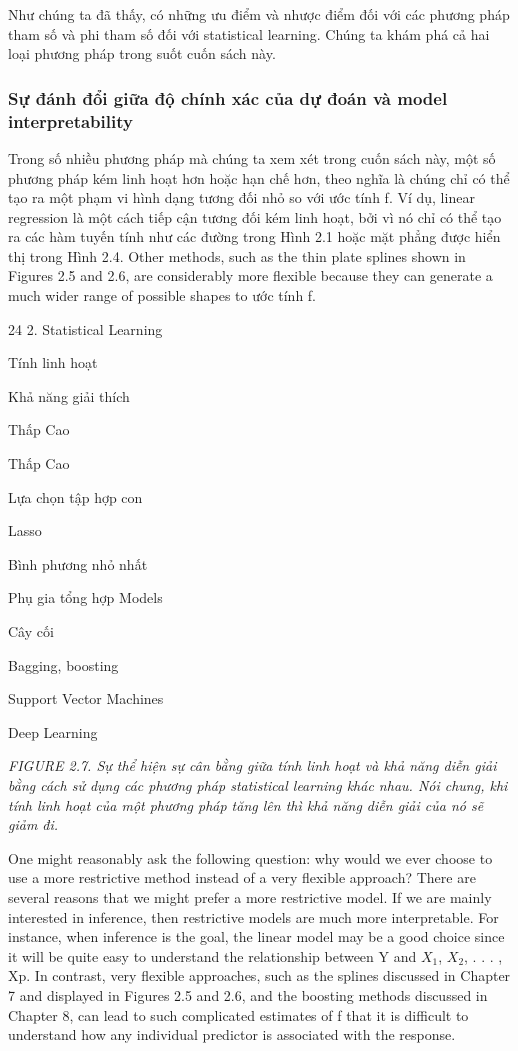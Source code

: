 Như chúng ta đã thấy, có những ưu điểm và nhược điểm đối với các phương pháp tham số và phi tham số đối với statistical learning. Chúng ta khám phá cả hai loại phương pháp trong suốt cuốn sách này.

\subsubsection{Sự đánh đổi giữa độ chính xác của dự đoán và model interpretability}

Trong số nhiều phương pháp mà chúng ta xem xét trong cuốn sách này, một số phương pháp kém linh hoạt hơn hoặc hạn chế hơn, theo nghĩa là chúng chỉ có thể tạo ra một phạm vi hình dạng tương đối nhỏ so với ước tính f. Ví dụ, linear regression là một cách tiếp cận tương đối kém linh hoạt, bởi vì nó chỉ có thể tạo ra các hàm tuyến tính như các đường trong Hình 2.1 hoặc mặt phẳng được hiển thị trong Hình 2.4. Other methods, such as the thin plate splines shown in Figures 2.5 and 2.6, are considerably more flexible because they can generate a much wider range of possible shapes to ước tính f.

24 2. Statistical Learning

Tính linh hoạt

Khả năng giải thích

Thấp Cao

Thấp Cao

Lựa chọn tập hợp con

Lasso

Bình phương nhỏ nhất

Phụ gia tổng hợp Models

Cây cối

Bagging, boosting

Support Vector Machines

Deep Learning

\noindent\textit{FIGURE 2.7. Sự thể hiện sự cân bằng giữa tính linh hoạt và khả năng diễn giải bằng cách sử dụng các phương pháp statistical learning khác nhau. Nói chung, khi tính linh hoạt của một phương pháp tăng lên thì khả năng diễn giải của nó sẽ giảm đi.}

One might reasonably ask the following question: why would we ever choose to use a more restrictive method instead of a very flexible approach? There are several reasons that we might prefer a more restrictive model. If we are mainly interested in inference, then restrictive models are much more interpretable. For instance, when inference is the goal, the linear model may be a good choice since it will be quite easy to understand the relationship between Y and $X_{1}$, $X_{2}$, . . . , Xp. In contrast, very flexible approaches, such as the splines discussed in Chapter 7 and displayed in Figures 2.5 and 2.6, and the boosting methods discussed in Chapter 8, can lead to such complicated estimates of f that it is difficult to understand how any individual predictor is associated with the response.

